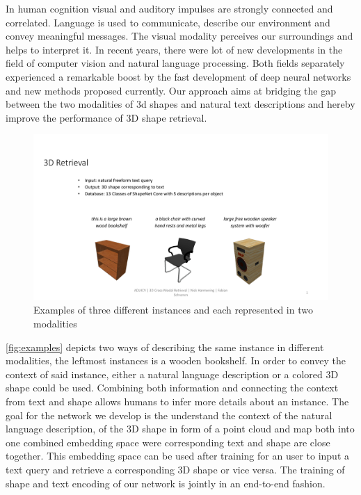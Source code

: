 \documentclass[10pt,twocolumn,letterpaper]{article}
\begin{document}
In human cognition visual and auditory impulses are strongly connected and correlated. Language is used to communicate, describe our environment and convey meaningful messages. The visual modality perceives our surroundings and helps to interpret it. In recent years, there were lot of new developments in the field of computer vision and natural language processing. Both fields separately experienced a remarkable boost by the fast development of deep neural networks and new methods proposed currently. Our approach aims at bridging the gap between the two modalities of 3d shapes and natural text descriptions and hereby improve the performance of 3D shape retrieval.
\begin{figure}[h]%
	\centering
	\includegraphics[width=0.8\linewidth]{fig1.pdf}
	\caption[]{Examples of three different instances and each represented in two modalities}
	\label{fig:examples}
\end{figure}
\autoref{fig:examples} depicts two ways of describing the same instance in different modalities, \eg the leftmost instances is a wooden bookshelf. In order to convey the context of said instance, either a natural language description or a colored 3D shape could be used. Combining both information and connecting the context from text and shape allows humans to infer more details about an instance. The goal for the network we develop is the understand the context of the natural language description, of the 3D shape in form of a point cloud and map both into one combined embedding space were corresponding text and shape are close together. This embedding space can be used after training for an user to input a text query and retrieve a corresponding 3D shape or vice versa. The training of shape and text encoding of our network is jointly in an end-to-end fashion. 
\end{document}
